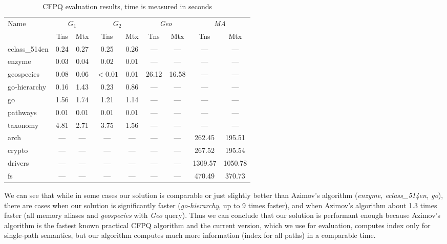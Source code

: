 {\setlength{\tabcolsep}{0.2em}
  \begin{table}
    \centering
    \caption{CFPQ evaluation results, time is measured in seconds}
    \label{tbl:CFPQ_index}
    \small
    \begin{tabular}{| l | c | c | c | c | c | c | c | c |}
      \hline

      \multirow{2}{*}{Name}  & \multicolumn{2}{c|}{$G_1$} & \multicolumn{2}{c|}{$G_2$} & \multicolumn{2}{c|}{\textit{Geo}} & \multicolumn{2}{c|}{\textit{MA}}\\
      \cline{2-9}
                      & Tns    & Mtx    & Tns  & Mtx  & Tns   & Mtx   & Tns     & Mtx \\
      \hline
      \hline
      eclass\_514en   & 0.24   & 0.27   & 0.25 & 0.26 & ---   & ---   & ---     & ---\\
      enzyme          & 0.03   & 0.04   & 0.02 & 0.01 & ---   & ---   & ---     & ---\\
      geospecies      & 0.08   & 0.06   & $<0.01$ & 0.01 & 26.12 & 16.58 & ---     & ---\\
      go-hierarchy    & 0.16   & 1.43   & 0.23 & 0.86 & ---   & ---   & ---     & ---\\
      go              & 1.56   & 1.74   & 1.21 & 1.14 & ---   & ---   & ---     & ---\\
      pathways        & 0.01   & 0.01   & 0.01 & 0.01 & ---   & ---   & ---     & ---\\
      taxonomy        & 4.81   & 2.71   & 3.75 & 1.56 & ---   & ---   & ---     & ---\\
      \hline
      arch            & ---    & ---    & ---  & ---  & ---   & ---   & 262.45  & 195.51  \\
      crypto          & ---    & ---    & ---  & ---  & ---   & ---   & 267.52  & 195.54  \\
      drivers         & ---    & ---    & ---  & ---  & ---   & ---   & 1309.57 & 1050.78 \\
      fs              & ---    & ---    & ---  & ---  & ---   & ---   & 470.49  & 370.73  \\
      \hline
    \end{tabular}
  \end{table}
}

We can see that while in some cases our solution is comparable or just slightly better than Azimov's algorithm (\textit{enzyme, eclass\_514en, go}), there are cases when our solution is significantly faster (\textit{go-hierarchy}, up to 9 times faster), and when Azimov's algorithm about 1.3 times faster (all memory aliases and \textit{geospecies} with \textit{Geo} query).
Thus we can conclude that our solution is performant enough because Azimov's algorithm is the fastest known practical CFPQ algorithm and the current version, which we use for evaluation, computes index only for single-path semantics, but our algorithm computes much more information (index for all paths) in a comparable time.


